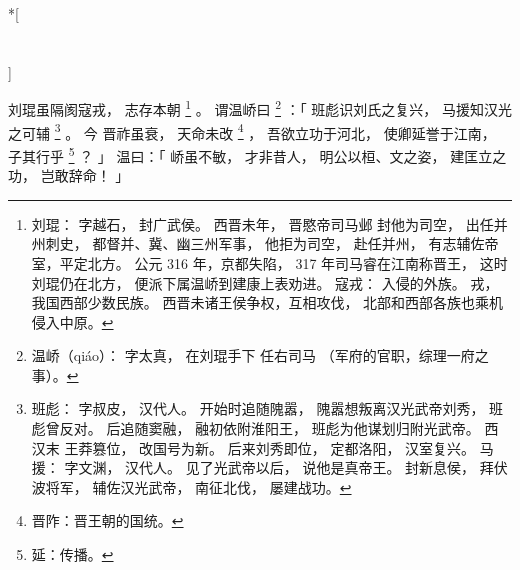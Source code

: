 
\switchcolumn[0]*[\section{}]

刘琨虽隔阂寇戎，
志存本朝%
\footnote{%
    刘琨：
        字越石，
        封广武侯。
        西晋未年，
        晋愍帝司马邺
        封他为司空，
        出任并州刺史，
        都督并、冀、幽三州军事，
        他拒为司空，
        赴任并州，
        有志辅佐帝室，平定北方。
        公元 316 年，京都失陷，
        317 年司马睿在江南称晋王，
        这时刘琨仍在北方，
        便派下属温峤到建康上表劝进。
    寇戎：
        入侵的外族。
        戎，我国西部少数民族。
        西晋未诸王侯争权，互相攻伐，
        北部和西部各族也乘机侵入中原。
}%
。
谓温峤曰%
\footnote{%
    温峤（qiáo）：
        字太真，
        在刘琨手下
        任右司马
        （军府的官职，综理一府之事）。
}%
：「
    班彪识刘氏之复兴，
    马援知汉光之可辅%
    \footnote{%
        班彪：
            字叔皮，
            汉代人。
            开始时追随隗嚣，
            隗嚣想叛离汉光武帝刘秀，
            班彪曾反对。
            后追随窦融，
            融初依附淮阳王，
            班彪为他谋划归附光武帝。
            西汉末
            王莽篡位，
            改国号为新。
            后来刘秀即位，
            定都洛阳，
            汉室复兴。
        马援：
            字文渊，
            汉代人。
            见了光武帝以后，
            说他是真帝王。
            封新息侯，
            拜伏波将军，
            辅佐汉光武帝，
            南征北伐，
            屡建战功。
    }%
    。
    今
    晋祚虽衰，
    天命未改%
    \footnote{%
        晋阼：晋王朝的国统。
    }%
    ，
    吾欲立功于河北，
    使卿延誉于江南，
    子其行乎%
    \footnote{%
        延：传播。
    }%
    ？
」
温曰：「
    峤虽不敏，
    才非昔人，
    明公以桓、文之姿，
    建匡立之功，
    岂敢辞命！
」

\switchcolumn



